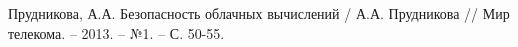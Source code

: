 \begingroup
\renewcommand{\section}[2]{\anonsection{Библиографический список}}
\begin{thebibliography}{00}

  Прудникова, А.А.
  Безопасность облачных вычислений /
  А.А. Прудникова //
  Мир телекома. -- 2013. -- №1. -- С. 50-55.

\end{thebibliography}
\endgroup

\clearpage